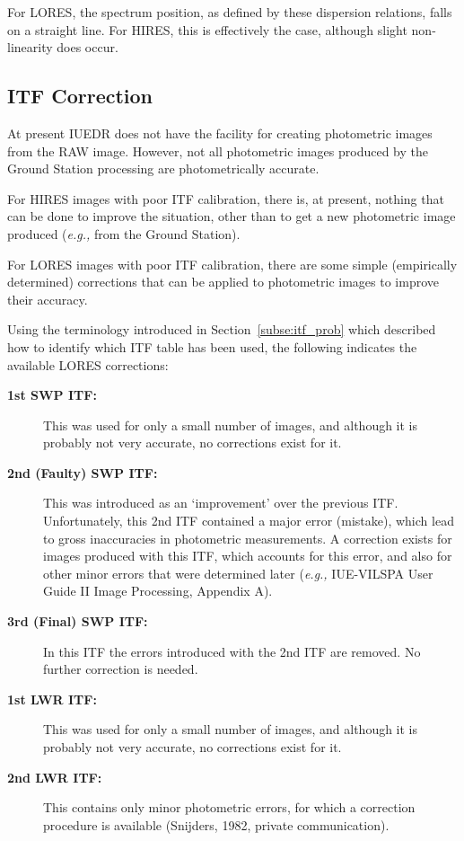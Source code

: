 For LORES, the spectrum position, as defined by these dispersion
relations, falls on a straight line.  For HIRES, this is effectively the
case, although slight non-linearity does occur.


\subsection{ITF Correction}

At present IUEDR does not have the facility for creating photometric images
from the RAW image.  However, not all photometric images produced by
the Ground Station processing are photometrically accurate.

For HIRES images with poor ITF calibration, there is, at present, nothing that
can be done to improve the situation, other than to get a new photometric image
produced ({\it{e.g.,}} from the Ground Station)\@.

For LORES images with poor ITF calibration, there are some simple (empirically
determined) corrections that can be applied to photometric images to
improve their accuracy.

Using the terminology introduced in Section~\ref{subse:itf_prob} which
described how to identify which ITF table has been used, the following
indicates the available LORES corrections:

\begin{description}

\item [{\bf 1st SWP ITF:}]
      This was used for only a small number of images, and
      although it is probably not very accurate, no corrections exist for it.

\item [{\bf 2nd (Faulty) SWP ITF:}]
      This was introduced as an `improvement' over the
      previous ITF\@.  Unfortunately, this 2nd ITF contained a major error
      (mistake), which lead to gross inaccuracies in photometric measurements.
      A correction exists for images produced with this ITF, which accounts for
      this error, and also for other minor errors that were determined later
      ({\it{e.g.,}} IUE-VILSPA User Guide II Image Processing, Appendix A)\@.

\item [{\bf 3rd (Final) SWP ITF:}]
      In this ITF the errors introduced with the 2nd
      ITF are removed.  No further correction is needed.

\item [{\bf 1st LWR ITF:}]
      This was used for only a small number of images, and
      although it is probably not very accurate, no corrections exist for it.

\item [{\bf 2nd LWR ITF:}]
      This contains only minor photometric errors, for
      which a correction procedure is available (Snijders, 1982, private
      communication)\@.

\end{description}

